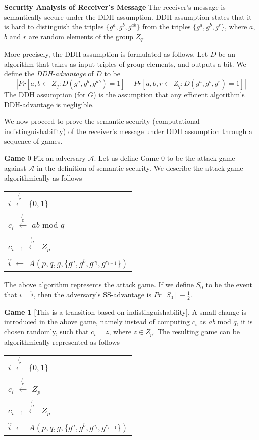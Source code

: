 \documentclass{article}
\begin{document}
\begin{enumerate}
\textbf{Security Analysis of Receiver's Message}\newline
The receiver's message is semantically secure under the DDH assumption. DDH assumption states that it is hard to distinguish the triples $\{g^a,g^b,g^{ab}\}$ from the triples $\{g^a,g^b,g^r\}$, where $a$, $b$ and $r$ are random elements of the group $Z_q$. 

More precisely, the DDH assumption is formulated as follows. Let $D$ be an algorithm that takes as input triples of group elements, and outputs a bit. We define the \textit{DDH-advantage} of $D$ to be
\begin{equation}
|Pr[{a, b \leftarrow Z_q}:D(g^a,g^b,g^{ab}) = 1] - Pr[{a,b,r \leftarrow Z_q}:D(g^a,g^b,g^{r}) = 1]|
\end{equation}
The DDH assumption (for $G$) is the assumption that any efficient algorithm's DDH-advantage is negligible.

We now proceed to prove the semantic security (computational indistinguishability) of the receiver's message under DDH assumption through a sequence of games.

\textbf{Game $0$} Fix an adversary $\mathcal{A}$. Let us define Game $0$ to be the attack game against $\mathcal{A}$ in the definition of semantic security. We describe the attack game algorithmically as follows

\begin{center}
\begin{tabular} {l}
$i$ $\xleftarrow[]{\not{\text{c}}}$ $\{0,1\}$\\
$c_i$ $\xleftarrow[]{\not{\text{c}}}$ $ab$ mod $q$\\
$c_{i-1}$ $\xleftarrow[]{\not{\text{c}}}$ $Z_p$\\
$\hat{i}$ $\leftarrow$ $A(p,q,g,\{g^a,g^b,g^{c_i},g^{c_{i-1}}\})$
\end{tabular}
\end{center}

The above algorithm represents the attack game. If we define $S_0$ to be the event that $i=\hat{i}$, then the adversary's SS-advantage is $Pr[S_0] - \frac{1}{2}$.

\textbf{Game 1} [This is a transition based on indistinguishability]. A small change is introduced in the above game, namely instead of computing $c_{i}$ as $ab$ mod $q$, it is chosen randomly, such that $c_{i} = z$, where $z \in Z_p$. The resulting game can be algorithmically represented as follows

\begin{center}
\begin{tabular} {l}
$i$ $\xleftarrow[]{\not{\text{c}}}$ $\{0,1\}$\\
$c_i$ $\xleftarrow[]{\not{\text{c}}}$ $Z_p$\\
$c_{i-1}$ $\xleftarrow[]{\not{\text{c}}}$ $Z_p$\\
$\hat{i}$ $\leftarrow$ $A(p,q,g,\{g^a,g^b,g^{c_i},g^{c_{i-1}}\})$
\end{tabular}
\end{center}


\end{enumerate}
\end{document}
